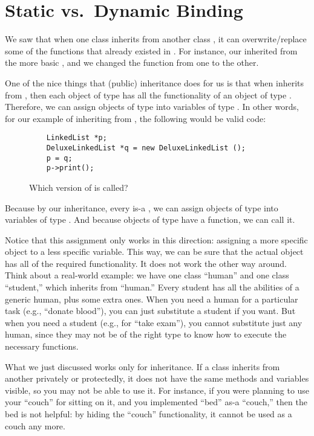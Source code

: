 \section{Static vs.~Dynamic Binding}
We saw that when one class  inherits from another class ,
it can overwrite/replace some of the functions that already existed in
.
For instance, our  inherited from the more basic
,
and we changed the  function from one to the other.

One of the nice things that (public) inheritance does for us is that when
 inherits from ,
then each object of type  has all the functionality of an
object of type .
Therefore, we can assign objects of type  into variables of
type .
In other words, for our example of 
inheriting from ,
the following would be valid code:

\begin{figure}[htb]
\begin{verbatim}
    LinkedList *p;
    DeluxeLinkedList *q = new DeluxeLinkedList ();
    p = q;
    p->print();
\end{verbatim}    
\caption{Which version of  is called? \label{code:InheritingLinkedList}}
\end{figure}

Because by our inheritance, every  is-a
, we can assign objects of type
 into variables of type .
And because objects of type  have a
 function, we can call it.

Notice that this assignment only works in this direction:
assigning a more specific object to a less specific variable.
This way, we can be sure that the actual object has all of the
required functionality.
It does not work the other way around.
Think about a real-world example:
we have one class ``human'' and one class ``student,''
which inherits from ``human.''
Every student has all the abilities of a generic human,
plus some extra ones.
When you need a human for a particular task (e.g., ``donate blood''),
you can just substitute a student if you want.
But when you need a student (e.g., for ``take exam''),
you cannot substitute just any human,
since they may not be of the right type to
know how to execute the necessary functions. 

What we just discussed works only for  inheritance. 
If a class inherits from another privately or protectedly,
it does not have the same methods and variables visible,
so you may not be able to use it.
For instance, if you were planning to use your ``couch'' for sitting on it,
and you implemented ``bed'' as-a ``couch,'' then the bed is not
helpful:
by hiding the ``couch'' functionality,
it cannot be used as a couch any more.

